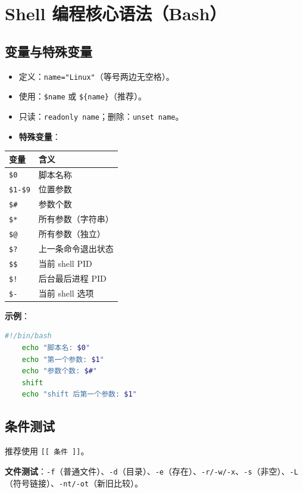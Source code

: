 \section{Shell 编程核心语法（Bash）}

\subsection{变量与特殊变量}
\begin{itemize}
\item 定义：\texttt{name="Linux"}（等号两边无空格）。
\item 使用：\texttt{\$name} 或 \texttt{\$\{name\}}（推荐）。
\item 只读：\texttt{readonly name}；删除：\texttt{unset name}。
\item \textbf{特殊变量}：
\end{itemize}

\begin{center}
	\begin{tabular}{ll}
		\toprule
		变量 & 含义 \\
		\midrule
		\texttt{\$0} & 脚本名称 \\
		\texttt{\$1-\$9} & 位置参数 \\
		\texttt{\$\#} & 参数个数 \\
		\texttt{\$*} & 所有参数（字符串） \\
		\texttt{\$@} & 所有参数（独立） \\
		\texttt{\$?} & 上一条命令退出状态 \\
		\texttt{\$\$} & 当前 shell PID \\
		\texttt{\$!} & 后台最后进程 PID \\
		\texttt{\$-} & 当前 shell 选项 \\
		\bottomrule
	\end{tabular}
\end{center}


\textbf{示例}：
\begin{lstlisting}[language=bash]
	#!/bin/bash
	echo "脚本名: $0"
	echo "第一个参数: $1"
	echo "参数个数: $#"
	shift
	echo "shift 后第一个参数: $1"
\end{lstlisting}

\subsection{条件测试} 推荐使用 \texttt{[[ 条件 ]]}。

\textbf{文件测试}：\texttt{-f}（普通文件）、\texttt{-d}（目录）、\texttt{-e}（存在）、\texttt{-r/-w/-x}、\texttt{-s}（非空）、\texttt{-L}（符号链接）、\texttt{-nt/-ot}（新旧比较）。

